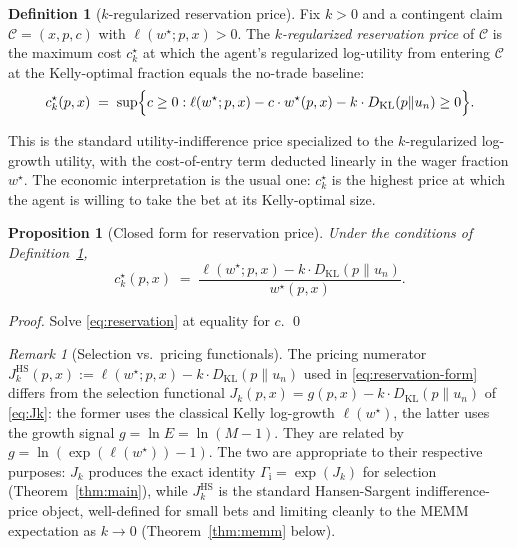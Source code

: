 \documentclass[11pt]{article}
\newtheorem{proposition}[theorem]{Proposition}
\theoremstyle{definition}
\newtheorem{definition}[theorem]{Definition}
\theoremstyle{remark}
\newtheorem{remark}[theorem]{Remark}
\newcommand{\C}{\mathcal{C}}
\newcommand{\G}{g}
\newcommand{\KL}{D_{\mathrm{KL}}}
\newcommand{\GROUND}{\Gamma_{\mathrm{i}}}
\begin{document}
\begin{definition}[$k$-regularized reservation price]\label{def:reservation}
Fix $k > 0$ and a contingent claim $\C = (x, p, c)$ with
$\ell(w^\star; p, x) > 0$. The \emph{$k$-regularized reservation
price} of $\C$ is the maximum cost $c^\star_k$ at which the agent's
regularized log-utility from entering $\C$ at the Kelly-optimal
fraction equals the no-trade baseline:
\begin{equation}
c^\star_k(p, x) \;=\; \sup \Bigl\{ c \ge 0 : \ell(w^\star; p, x) - c \cdot w^\star(p, x)
    - k \cdot \KL(p \| u_n) \ge 0 \Bigr\}.
\label{eq:reservation}
\end{equation}
\end{definition}

This is the standard utility-indifference price specialized to the
$k$-regularized log-growth utility, with the cost-of-entry term
deducted linearly in the wager fraction $w^\star$. The economic
interpretation is the usual one: $c^\star_k$ is the highest price at
which the agent is willing to take the bet at its Kelly-optimal size.

\begin{proposition}[Closed form for reservation price]\label{prop:reservation}
Under the conditions of Definition~\ref{def:reservation},
\begin{equation}
c^\star_k(p, x) \;=\; \frac{\ell(w^\star; p, x) - k \cdot \KL(p \| u_n)}{w^\star(p, x)}.
\label{eq:reservation-form}
\end{equation}
\end{proposition}

\begin{proof}
Solve \eqref{eq:reservation} at equality for $c$. \qed
\end{proof}

\begin{remark}[Selection vs.\ pricing functionals]\label{rem:two-jk}
The pricing numerator $J_k^{\mathrm{HS}}(p, x) := \ell(w^\star; p, x)
- k \cdot \KL(p \| u_n)$ used in \eqref{eq:reservation-form} differs
from the selection functional $J_k(p, x) = \G(p, x) - k \cdot \KL(p \|
u_n)$ of \eqref{eq:Jk}: the former uses the classical Kelly log-growth
$\ell(w^\star)$, the latter uses the growth signal $\G = \ln E = \ln(M
- 1)$. They are related by $\G = \ln(\exp(\ell(w^\star)) - 1)$. The
two are appropriate to their respective purposes: $J_k$ produces the
exact identity $\GROUND = \exp(J_k)$ for selection
(Theorem~\ref{thm:main}), while $J_k^{\mathrm{HS}}$ is the standard
Hansen-Sargent indifference-price object, well-defined for small bets
and limiting cleanly to the MEMM expectation as $k \to 0$
(Theorem~\ref{thm:memm} below).
\end{remark}
\end{document}
